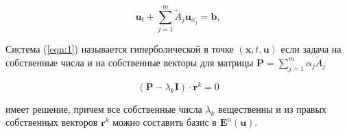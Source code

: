 		\begin{equation}
			\mathbf{u}_{t} + \sum_{j = 1}^{m} \tilde{A}_{j} \mathbf{u}_{x_{j}} = \mathbf{b},
			\label{eqn:1}
		\end{equation}

		Система (\ref{eqn:1}) называется гиперболической в точке $\left( \mathbf{x}, t, \mathbf{u} \right)$ если задача на собственные числа и на собственные векторы для матрицы $\mathbf{P} = \sum_{j = 1}^{m} \alpha_{j} \tilde{A}_{j}$
		
		\begin{equation}
			\left( \mathbf{P} - \lambda_{k} \mathbf{I} \right) \cdot \mathbf{r}^{k} = 0
		\end{equation}
		
		имеет решение, причем все собственные числа $\lambda_{k}$ вещественны и из правых собственных векторов $ \mathbf{r}^{k}$ можно составить базис в $\mathbf{E}^{n} \left( \mathbf{u} \right)$.

		\newpage
